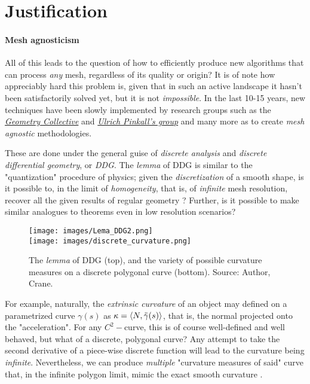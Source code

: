 \section{Justification}


\paragraph{Mesh agnosticism}
All of this leads to the question of how to efficiently produce new
algorithms that can process \textit{ any} mesh, regardless
of its quality or origin? It is of note how appreciably hard this
problem is, given that in such an active landscape it hasn't been
satisfactorily solved yet, but it is not \textit{impossible}.
In the last 10-15 years, new techniques have been slowly implemented
by research groups such as the \href{https://github.com/GeometryCollective}{\textit{Geometry Collective}} and \href{https://scholar.google.com/citations?hl=de&user=FNe48c8AAAAJ&view_op=list_works&sortby=pubdate}{\textit{Ulrich Pinkall's group}}
and many more as to create \textit{mesh agnostic} methodologies.

\spa

These are done
under the general guise of \textit{discrete analysis}
and \textit{discrete differential geometry}, or \textit{DDG}. 
The \textit{lemma} of DDG is similar to the "quantization" procedure of physics; 
given the \textit{discretization} of a smooth shape, is it possible to,
in the limit of \textit{homogeneity}, that is, of \textit{infinite} mesh resolution,
recover all the given results of regular geometry
\cite{Crane_discrete}? Further, is it possible
to make similar analogues to theorems even in low resolution scenarios?


\begin{figure}[h]
    \centering
    \texttt{[image: images/Lema\_DDG2.png]}\\[1.7ex] %
    \texttt{[image: images/discrete\_curvature.png]}
    \caption{The \textit{lemma} of DDG (top), and the variety of possible
    curvature measures on a discrete polygonal curve (bottom). Source: Author, Crane.}
    \label{fig:two-vertical-images}
\end{figure}

For example, naturally, the \textit{extrinsic curvature}
of an object may defined on a parametrized curve
$\gamma(s)$ as $\kappa = \langle N, \Ddot{\gamma}(s)\rangle$, that is, the normal projected
onto the "acceleration". For any
$C^2-$curve, this is of course well-defined
and well behaved, but what of a discrete,
polygonal curve? Any attempt to take the second
derivative of a piece-wise discrete function
will lead to the curvature being \textit{infinite}.
Nevertheless, we can produce \textit{multiple}
"curvature measures of said" curve that,
in the infinite polygon limit, mimic the
exact smooth curvature \cite{Crane:2013:DGP}.

